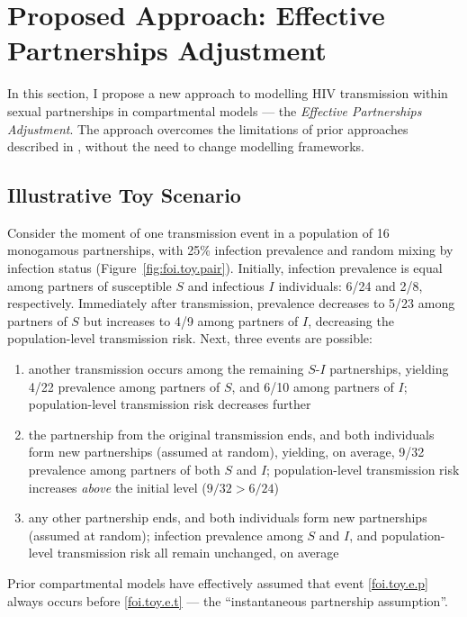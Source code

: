 \section{Proposed Approach: Effective Partnerships Adjustment}\label{foi.prop}
In this section, I propose a new approach to
modelling HIV transmission within sexual partnerships in compartmental models
--- the \emph{Effective Partnerships Adjustment}.
The approach overcomes the limitations of prior approaches described in ,
without the need to change modelling frameworks.
\subsection{Illustrative Toy Scenario}\label{foi.prop.toy}
Consider the moment of one transmission event
in a population of 16 monogamous partnerships, with 25\% infection prevalence
and random mixing by infection status (Figure~\ref{fig:foi.toy.pair}).
Initially, infection prevalence is equal among partners of
susceptible $S$ and infectious $I$ individuals: 6/24 and 2/8, respectively.
Immediately after transmission,
prevalence decreases to 5/23 among partners of $S$ but increases to 4/9 among partners of $I$,
decreasing the population-level transmission risk.
Next, three events are possible:
\begin{enumerate}[label=(\alph*)]
  \item \label{foi.toy.e.t}
  another transmission occurs among the remaining $S$-$I$ partnerships,
  yielding 4/22 prevalence among partners of $S$, and 6/10 among partners of $I$;
  population-level transmission risk decreases further
  \item \label{foi.toy.e.p}
  the partnership from the original transmission ends,
  and both individuals form new partnerships (assumed at random),
  yielding, on average, 9/32 prevalence among partners of both $S$ and $I$;
  population-level transmission risk increases \emph{above} the initial level ($9/32 > 6/24$)
  \item \label{foi.toy.e.q}
  any other partnership ends,
  and both individuals form new partnerships (assumed at random);
  infection prevalence among $S$ and $I$, and population-level transmission risk
  all remain unchanged, on average
\end{enumerate}
Prior compartmental models have effectively assumed that
event \ref{foi.toy.e.p} always occurs before \ref{foi.toy.e.t}
--- \ie the ``instantaneous partnership assumption''.

